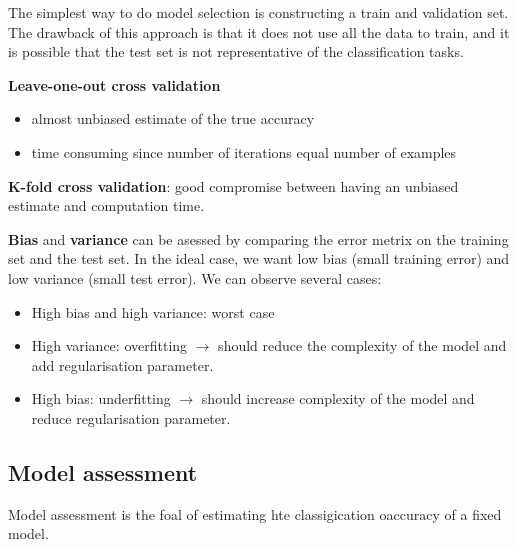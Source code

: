 The simplest way to do model selection is constructing a train and validation set. The drawback of this approach is that it does not use all the data to train, and it is possible that the test set is not representative of the classification tasks.

\textbf{Leave-one-out cross validation}
\begin{itemize}
	\item almost unbiased estimate of the true accuracy
	\item time consuming since number of iterations equal number of examples
\end{itemize}

\textbf{K-fold cross validation}: good compromise between having an unbiased estimate and computation time.

\textbf{Bias} and \textbf{variance} can be asessed by comparing the error metrix on the training set and the test set. In the ideal case, we want low bias (small training error) and low variance (small test error). We can observe several cases:
\begin{itemize}
	\item High bias and high variance: worst case
	\item High variance: overfitting $\rightarrow$ should reduce the complexity of the model and add regularisation parameter.
	\item High bias: underfitting $\rightarrow$ should increase complexity of the model and reduce regularisation parameter.
\end{itemize}

\subsection{Model assessment}
Model assessment is the foal of estimating hte classigication oaccuracy of a fixed model.